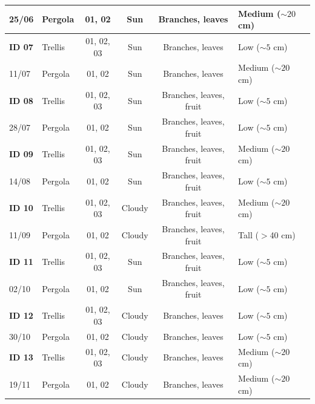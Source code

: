 \documentclass[11pt]{article}
\begin{document}
\begin{table}[htbp]
{\begin{tabular}{@{}llcccl@{}}
25/06          & Pergola & 01, 02     & Sun          & Branches, leaves              & Medium ($\sim 20$ cm)   \\ \midrule
\textbf{ID 07} & Trellis & 01, 02, 03 & Sun          & Branches, leaves              & Low ($\sim 5$ cm)    \\
11/07          & Pergola & 01, 02     & Sun          & Branches, leaves              & Medium ($\sim 20$ cm)    \\ \midrule
\textbf{ID 08} & Trellis & 01, 02, 03 & Sun          & Branches, leaves, fruit       & Low ($\sim 5$ cm)    \\
28/07          & Pergola & 01, 02     & Sun          & Branches, leaves, fruit       & Low ($\sim 5$ cm)    \\ \midrule
\textbf{ID 09} & Trellis & 01, 02, 03 & Sun          & Branches, leaves, fruit       & Medium ($\sim 20$ cm) \\
14/08          & Pergola & 01, 02     & Sun          & Branches, leaves, fruit       & Low ($\sim 5$ cm) \\ \midrule
\textbf{ID 10} & Trellis & 01, 02, 03 & Cloudy        & Branches, leaves, fruit       & Medium ($\sim 20$ cm) \\
11/09          & Pergola & 01, 02     & Cloudy        & Branches, leaves, fruit       & Tall ($>$40 cm) \\ 
\midrule
\textbf{ID 11} & Trellis & 01, 02, 03 & Sun              & Branches, leaves, fruit             & Low ($\sim 5$ cm)   \\
02/10          & Pergola & 01, 02     & Sun              & Branches, leaves, fruit             & Low ($\sim 5$ cm)    \\ \midrule
\textbf{ID 12} & Trellis & 01, 02, 03 & Cloudy               & Branches, leaves             & Low ($\sim 5$ cm)    \\
30/10          & Pergola & 01, 02     & Cloudy               & Branches, leaves             & Low ($\sim 5$ cm)    \\ \midrule
\textbf{ID 13} & Trellis & 01, 02, 03 & Cloudy              & Branches, leaves            & Medium ($\sim 20$ cm)   \\
19/11          & Pergola & 01, 02     & Cloudy              & Branches, leaves            & Medium ($\sim 20$ cm)   \\ 
\bottomrule
\end{tabular}
}
\end{table}
\end{document}
